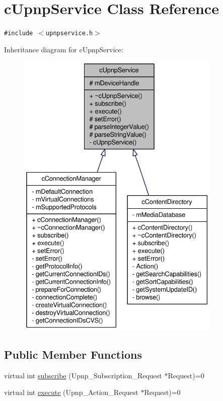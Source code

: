 \hypertarget{classcUpnpService}{
\section{cUpnpService Class Reference}
\label{classcUpnpService}
}
{\tt \#include $<$upnpservice.h$>$}

Inheritance diagram for cUpnpService:\nopagebreak
\begin{figure}[H]
\begin{center}
\leavevmode
\includegraphics[height=400pt]{classcUpnpService__inherit__graph}
\end{center}
\end{figure}
\subsection*{Public Member Functions}
\begin{CompactItemize}
\item 
virtual int \hyperlink{classcUpnpService_e6d3522d580e5975f5a38d5bea88e29d}{subscribe} (Upnp\_\-Subscription\_\-Request $\ast$Request)=0
\item 
virtual int \hyperlink{classcUpnpService_bbffca233e6aa193eda223cb7bfc2917}{execute} (Upnp\_\-Action\_\-Request $\ast$Request)=0
\end{CompactItemize}
